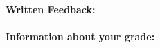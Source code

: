 \documentclass[letterpaper,11pt]{../resources/texMemo}
\begin{document}
\maketitle

\paragraph{Written Feedback:}






\paragraph{Information about your grade:}
\begin{description}
\item





\end{description}
\end{document}
